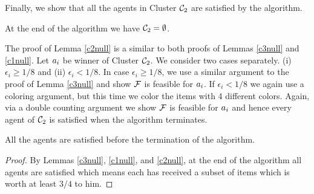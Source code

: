 Finally, we show that all the agents in Cluster $\mathcal{C}_2$ are satisfied by the algorithm.
\begin{lemma}
	\label{c2null}
	At the end of the algorithm we have $\mathcal{C}_2 = \emptyset$.
\end{lemma}
The proof of Lemma \ref{c2null} is a similar to both proofs of Lemmas \ref{c3null} and \ref{c1null}. Let $a_i$ be winner of Cluster $\mathcal{C}_2$. We consider two cases separately. (i) $\epsilon_i \geq 1/8$ and (ii) $\epsilon_i < 1/8$.
In case $\epsilon_i \geq 1/8$, we use a similar argument to the proof of Lemma \ref{c3null} and show $\mathcal{F}$ is feasible for $a_i$. If $\epsilon_i < 1/8$ we again use a coloring argument, but this time we color the items with 4 different colors. Again, via a double counting argument we show $\mathcal{F}$ is feasible for $a_i$ and hence every agent of $\mathcal{C}_2$ is satisfied when the algorithm terminates. 
\begin{theorem}
	\label{34main}
	All the agents are satisfied before the termination of the algorithm.
\end{theorem}
\begin{proof}
	By Lemmas \ref{c3null}, \ref{c1null}, and \ref{c2null}, at the end of the algorithm all agents are satisfied which means each has received a subset of items which is worth at least $3/4$ to him.
\end{proof}
